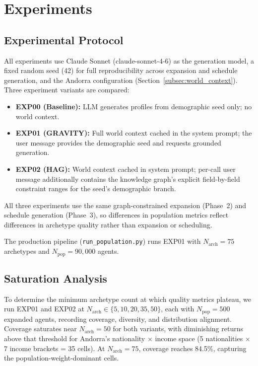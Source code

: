 \documentclass[sustainability,article,submit,pdftex,moreauthors]{Definitions/mdpi}
\begin{document}
\section{Experiments}
\label{sec:experiments}

\subsection{Experimental Protocol}
\label{subsec:exp_protocol}

All experiments use Claude Sonnet (claude-sonnet-4-6) as the generation
model, a fixed random seed (42) for full reproducibility across expansion
and schedule generation, and the Andorra configuration
(Section~\ref{subsec:world_context}). Three experiment variants are compared:

\begin{itemize}
\item \textbf{EXP00 (Baseline):} LLM generates profiles from demographic seed
      only; no world context.
\item \textbf{EXP01 (GRAVITY):} Full world context cached in the system
      prompt; the user message provides the demographic seed and requests
      grounded generation.
\item \textbf{EXP02 (HAG):} World context cached in system prompt; per-call
      user message additionally contains the knowledge graph's explicit
      field-by-field constraint ranges for the seed's demographic branch.
\end{itemize}

All three experiments use the same graph-constrained expansion (Phase~2)
and schedule generation (Phase~3), so differences in population metrics
reflect differences in archetype quality rather than expansion or scheduling.

The production pipeline (\texttt{run\_population.py}) runs EXP01 with
$N_\text{arch} = 75$ archetypes and $N_\text{pop} = 90{,}000$ agents.

\subsection{Saturation Analysis}
\label{subsec:saturation}

To determine the minimum archetype count at which quality metrics plateau,
we run EXP01 and EXP02 at $N_\text{arch} \in \{5, 10, 20, 35, 50\}$,
each with $N_\text{pop} = 500$ expanded agents, recording coverage, diversity,
and distribution alignment. Coverage saturates near $N_\text{arch} = 50$
for both variants, with diminishing returns above that threshold for
Andorra's nationality $\times$ income space (5 nationalities
$\times$ 7 income brackets = 35 cells). At $N_\text{arch} = 75$, coverage
reaches 84.5\%, capturing the population-weight-dominant cells.
\end{document}
